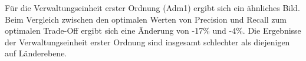 			Für die Verwaltungseinheit erster Ordnung (Adm1) ergibt sich ein ähnliches Bild. 
			Beim Vergleich zwischen den optimalen Werten von Precision und Recall zum optimalen Trade-Off ergibt sich eine Änderung von -17\% und -4\%.
			Die Ergebnisse der Verwaltungseinheit erster Ordnung sind insgesamt schlechter als diejenigen auf Länderebene. 

			


